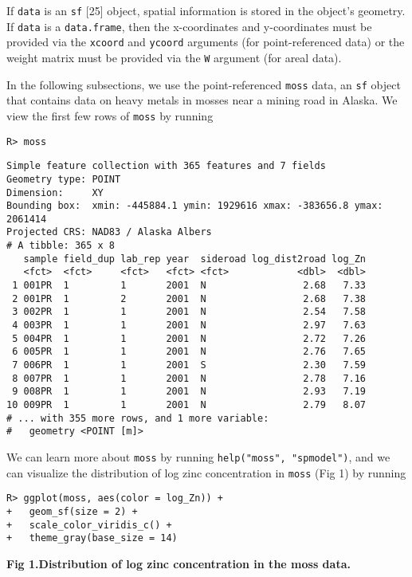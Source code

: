 \documentclass[10pt,letterpaper]{article}
\begin{document}
If \texttt{data} is an \texttt{sf} {[}25{]} object, spatial information
is stored in the object's geometry. If \texttt{data} is a
\texttt{data.frame}, then the x-coordinates and y-coordinates must be
provided via the \texttt{xcoord} and \texttt{ycoord} arguments (for
point-referenced data) or the weight matrix must be provided via the
\texttt{W} argument (for areal data).

In the following subsections, we use the point-referenced \texttt{moss}
data, an \texttt{sf} object that contains data on heavy metals in mosses
near a mining road in Alaska. We view the first few rows of
\texttt{moss} by running

\begin{verbatim}
R> moss
\end{verbatim}

\begin{verbatim}
Simple feature collection with 365 features and 7 fields
Geometry type: POINT
Dimension:     XY
Bounding box:  xmin: -445884.1 ymin: 1929616 xmax: -383656.8 ymax: 2061414
Projected CRS: NAD83 / Alaska Albers
# A tibble: 365 x 8
   sample field_dup lab_rep year  sideroad log_dist2road log_Zn
   <fct>  <fct>     <fct>   <fct> <fct>            <dbl>  <dbl>
 1 001PR  1         1       2001  N                 2.68   7.33
 2 001PR  1         2       2001  N                 2.68   7.38
 3 002PR  1         1       2001  N                 2.54   7.58
 4 003PR  1         1       2001  N                 2.97   7.63
 5 004PR  1         1       2001  N                 2.72   7.26
 6 005PR  1         1       2001  N                 2.76   7.65
 7 006PR  1         1       2001  S                 2.30   7.59
 8 007PR  1         1       2001  N                 2.78   7.16
 9 008PR  1         1       2001  N                 2.93   7.19
10 009PR  1         1       2001  N                 2.79   8.07
# ... with 355 more rows, and 1 more variable:
#   geometry <POINT [m]>
\end{verbatim}

\noindent We can learn more about \texttt{moss} by running
\texttt{help("moss",\ "spmodel")}, and we can visualize the distribution
of log zinc concentration in \texttt{moss} (Fig 1) by running

\begin{verbatim}
R> ggplot(moss, aes(color = log_Zn)) +
+   geom_sf(size = 2) +
+   scale_color_viridis_c() +
+   theme_gray(base_size = 14)
\end{verbatim}

\textbf{Fig 1.Distribution of log zinc concentration in the moss data.}
\end{document}
